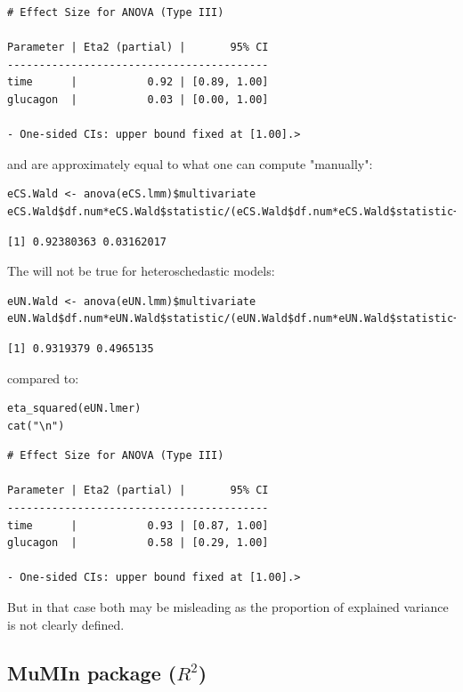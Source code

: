 \documentclass[12pt]{article}
\begin{document}
\begin{verbatim}
# Effect Size for ANOVA (Type III)

Parameter | Eta2 (partial) |       95% CI
-----------------------------------------
time      |           0.92 | [0.89, 1.00]
glucagon  |           0.03 | [0.00, 1.00]

- One-sided CIs: upper bound fixed at [1.00].>
\end{verbatim}


and are approximately equal to what one can compute "manually":
\lstset{language=r,label= ,caption= ,captionpos=b,numbers=none}
\begin{lstlisting}
eCS.Wald <- anova(eCS.lmm)$multivariate
eCS.Wald$df.num*eCS.Wald$statistic/(eCS.Wald$df.num*eCS.Wald$statistic+eCS.Wald$df.denom)
\end{lstlisting}

\begin{verbatim}
[1] 0.92380363 0.03162017
\end{verbatim}


The will not be true for heteroschedastic models:
\lstset{language=r,label= ,caption= ,captionpos=b,numbers=none}
\begin{lstlisting}
eUN.Wald <- anova(eUN.lmm)$multivariate
eUN.Wald$df.num*eUN.Wald$statistic/(eUN.Wald$df.num*eUN.Wald$statistic+eUN.Wald$df.denom)
\end{lstlisting}

\begin{verbatim}
[1] 0.9319379 0.4965135
\end{verbatim}


compared to:
\lstset{language=r,label= ,caption= ,captionpos=b,numbers=none}
\begin{lstlisting}
eta_squared(eUN.lmer)
cat("\n")
\end{lstlisting}

\begin{verbatim}
# Effect Size for ANOVA (Type III)

Parameter | Eta2 (partial) |       95% CI
-----------------------------------------
time      |           0.93 | [0.87, 1.00]
glucagon  |           0.58 | [0.29, 1.00]

- One-sided CIs: upper bound fixed at [1.00].>
\end{verbatim}


But in that case both may be misleading as the proportion of explained
variance is not clearly defined.

\subsection{MuMIn package (\(R^2\))}
\label{sec:orgc264787}
\end{document}
